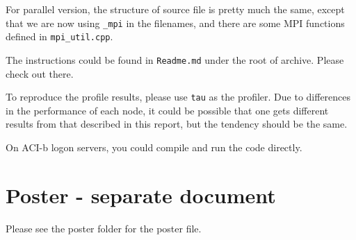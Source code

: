 \documentclass{article}
\begin{document}
\begin{spacing}{1.1}
\begin{appendices}
For parallel version, the structure of source file is pretty much the same, except that we are now using \texttt{\_mpi} in the filenames, and there are some MPI functions defined in \texttt{mpi\_util.cpp}.

The instructions could be found in \texttt{Readme.md} under the root of archive. Please check out there.

To reproduce the profile results, please use \texttt{tau} as the profiler. Due to differences in the performance of each node, it could be possible that one gets different results from that described in this report, but the tendency should be the same.

On ACI-b logon servers, you could compile and run the code directly.

\section{Poster - separate document}

Please see the poster folder for the poster file.


\end{appendices}





\end{spacing}
\end{document}
